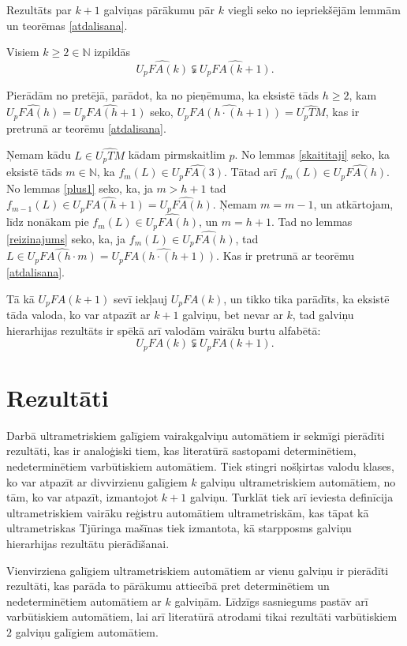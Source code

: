\documentclass{ludis}
\begin{document}
Rezultāts par $k + 1$ galviņas pārākumu pār $k$ viegli seko no iepriekšējām lemmām un teorēmas \ref{atdalisana}.
\begin{teorema}
Visiem $k \geq 2 \in \mathbb{N}$ izpildās
\[
	\widehat{U_pFA(k)} \subsetneqq \widehat{U_pFA(k + 1)}.
\]
\end{teorema}
\begin{pieradijums}
Pierādām no pretējā, parādot, ka no pieņēmuma, ka eksistē tāds $h \geq 2$, kam $\widehat{U_pFA(h)} = \widehat{U_pFA(h + 1)}$ seko, $\widehat{U_pFA(h \cdot (h + 1))} = \widehat{U_pTM}$, kas ir pretrunā ar teorēmu \ref{atdalisana}.

Ņemam kādu $L \in \widehat{U_pTM}$ kādam pirmskaitlim $p$. No lemmas \ref{skaititaji} seko, ka eksistē tāds $m \in \mathbb{N}$, ka $f_m(L) \in \widehat{U_pFA(3)}$. Tātad arī $f_m(L) \in \widehat{U_pFA(h)}$. No lemmas \ref{plus1} seko, ka, ja $m > h + 1$ tad $f_{m-1}(L) \in \widehat{U_pFA(h + 1)} = \widehat{U_pFA(h)}$. Ņemam $m = m - 1$, un atkārtojam, līdz nonākam pie $f_m(L) \in \widehat{U_pFA(h)}$, un $m = h + 1$. Tad no lemmas \ref{reizinajums} seko, ka, ja $f_m(L) \in \widehat{U_pFA(h)}$, tad $L \in \widehat{U_pFA(h \cdot m)} = \widehat{U_pFA(h \cdot (h + 1))}$. Kas ir pretrunā ar teorēmu \ref{atdalisana}.
\end{pieradijums}
\begin{sekas}
Tā kā $U_pFA(k + 1)$ sevī iekļauj $U_pFA(k)$, un tikko tika parādīts, ka eksistē tāda valoda, ko var atpazīt ar $k+1$ galviņu, bet nevar ar $k$, tad galviņu hierarhijas rezultāts ir spēkā arī valodām vairāku burtu alfabētā:
\[
	U_pFA(k) \subsetneqq U_pFA(k + 1).
\]
\end{sekas}

\chapter{Rezultāti}
Darbā ultrametriskiem galīgiem vairakgalviņu automātiem ir sekmīgi pierādīti rezultāti, kas ir analoģiski tiem, kas literatūrā sastopami determinētiem, nedeterminētiem varbūtiskiem automātiem. Tiek stingri nošķirtas valodu klases, ko var atpazīt ar divvirzienu galīgiem $k$ galviņu ultrametriskiem automātiem, no tām, ko var atpazīt, izmantojot $k+1$ galviņu. Turklāt tiek arī ieviesta definīcija ultrametriskiem vairāku reģistru automātiem ultrametriskām, kas tāpat kā ultrametriskas Tjūringa mašīnas tiek izmantota, kā starpposms galviņu hierarhijas rezultātu pierādīšanai.

Vienvirziena galīgiem ultrametriskiem automātiem ar vienu galviņu ir pierādīti rezultāti, kas parāda to pārākumu attiecībā pret determinētiem un nedeterminētiem automātiem ar $k$ galviņām. Līdzīgs sasniegums pastāv arī varbūtiskiem automātiem, lai arī literatūrā atrodami tikai rezultāti varbūtiskiem $2$ galviņu galīgiem automātiem.
\end{document}
